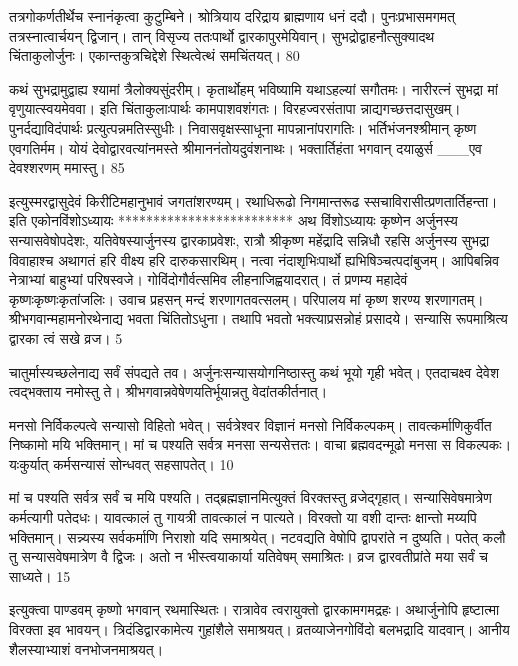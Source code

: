 तत्रगोकर्णतीर्थेच स्नानंकृत्वा कुटुम्बिने।
 श्रोत्रियाय दरिद्राय ब्राह्मणाय धनं ददौ।
 पुनःप्रभासमगमत् तत्रस्नात्वार्चयन् द्विजान्।
 तान् विसृज्य ततःपार्थो द्वारकापुरमेयिवान्।
 सुभद्रोद्वाहनौत्सुक्यादथ चिंताकुलोर्जुनः।
 एकान्तकुत्रचिद्देशे स्थित्वेत्थं समचिंतयत्।
 80

  कथं सुभद्रामुद्वाह्य श्यामां त्रैलोक्यसुंदरीम्।
 कृतार्थोहम् भविष्यामि यथाऽहल्यां सगौतमः।
 नारीरत्नं सुभद्रा मां वृणुयात्स्वयमेववा।
 इति चिंताकुलाःपार्थः कामपाशवशंगतः।
 विरहज्वरसंतापा न्नाद्यगच्छत्तदासुखम्।
 पुनर्दद्याविदंपार्थः प्रत्युत्पन्नमतिस्सुधीः।
 निवासवृक्षस्साधूना मापन्नानांपरागतिः।
 भर्तिभंजनश्श्रीमान् कृष्ण एवगतिर्मम।
 योयं देवोद्वारवत्यांनमस्ते श्रीमाननंतोयदुवंशनाथः।
 भक्तार्तिहंता भगवान् दयाळुर्स
___एव देवश्शरणम् ममास्तु।
85

 इत्युस्मरद्वासुदेवं किरीटिमहानुभावं
जगतांशरण्यम्।
 रथाधिरूढो निगमान्तरूढ
स्सचाविरासीत्प्रणतार्तिहन्ता।
 इति एकोनविंशोऽध्यायः
*************************
अथ विंशोऽध्यायः कृष्णेन अर्जुनस्य सन्यासवेषोपदेशः, यतिवेषस्यार्जुनस्य द्वारकाप्रवेशः, रात्रौ श्रीकृष्ण महेंद्रादि सन्निधौ रहसि अर्जुनस्य सुभद्रा विवाहाश्च अथागतं हरि वीक्ष्य हरि दारुकसारथिम्।
 नत्वा नंदाशृभिःपार्थो ह्यभिषिञ्चत्पदांबुजम्।
 आपिबन्निव नेत्राभ्यां बाहुभ्यां परिषस्वजे।
 गोविंदोगौर्वत्समिव लीहनाजिह्वयादरात्।
 तं प्रणम्य महादेवं कृष्णःकृष्णःकृतांजलिः।
 उवाच प्रहसन् मन्दं शरणागतवत्सलम्।
 परिपालय मां कृष्ण शरण्य शरणागतम्।
 श्रीभगवान्महामनोरथेनाद्य भवता चिंतितोऽधुना।
 तथापि भवतो भक्त्याप्रसन्नोहं प्रसादये।
 सन्यासि रूपमाश्रित्य द्वारका त्वं सखे व्रज।
 5

  चातुर्मास्यच्छलेनाद्य सर्वं संपद्यते तव।
 अर्जुनःसन्यासयोगनिष्ठास्तु कथं भूयो गृही भवेत्।
 एतदाचक्ष्व देवेश त्वद्भक्ताय नमोस्तु ते।
 श्रीभगवान्नवेषेणयतिर्भूयान्नतु वेदांतकीर्तनात्।
 
मनसो निर्विकल्पत्वे सन्यासो विहितो भवेत्।
 सर्वत्रेश्वर विज्ञानं मनसो निर्विकल्पकम्।
 तावत्कर्माणिकुर्वीत निष्कामो मयि भक्तिमान्।
 मां च पश्यति सर्वत्र मनसा सन्यसेत्ततः।
 वाचा ब्रह्मवदन्मूढो मनसा स विकल्पकः।
 यःकुर्यात् कर्मसन्यासं सोन्धवत् सहसापतेत्।
 10

  मां च पश्यति सर्वत्र सर्वं च मयि पश्यति।
 तद्ब्रह्मज्ञानमित्युक्तं विरक्तस्तु व्रजेद्गृहात्।
 सन्यासिवेषमात्रेण कर्मत्यागी पतेदधः।
 यावत्कालं तु गायत्री तावत्कालं न पात्यते।
 विरक्तो या वशी दान्तः क्षान्तो मय्यपि भक्तिमान्।
 सन्न्यस्य सर्वकर्माणि निराशो यदि समाश्रयेत्।
 नटवद्यति वेषोपि द्वापरांते न दुष्यति।
 पतेत् कलौ तु सन्यासवेषमात्रेण वै द्विजः।
 अतो न भीस्त्वयाकार्या यतिवेषम् समाश्रितः।
 व्रज द्वारवतीप्रांते मया सर्वं च साध्यते।
 15

  इत्युक्त्वा पाण्डवम् कृष्णो भगवान् रथमास्थितः।
 रात्रावेव त्वरायुक्तो द्वारकामगमद्रहः।
 अथार्जुनोपि हृष्टात्मा विरक्ता इव भावयन्।
 त्रिदंडिद्वारकामेत्य गुहांशैले समाश्रयत्।
 व्रतव्याजेनगोविंदो बलभद्रादि यादवान्।
 आनीय शैलस्याभ्याशं वनभोजनमाश्रयत्।
 

